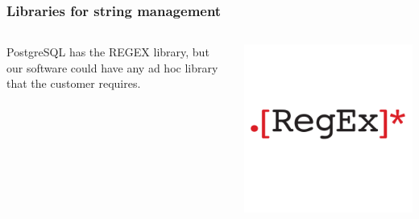 \documentclass{beamer}
\begin{document}
\begin{frame}
	\frametitle{Libraries for string management}
	\begin{columns}
	\begin{column}{0.4\textwidth}
		PostgreSQL has the REGEX library, but our software could have any ad hoc library that the customer requires. 		
	\end{column}
	
	\begin{column}{0.4\textwidth}
		\includegraphics[width=\columnwidth]{regex1-985818275.png}
	\end{column}

	\end{columns}


\end{frame}
\end{document}
